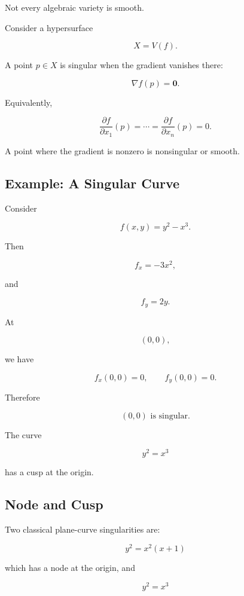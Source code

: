 Not every algebraic variety is smooth.

Consider a hypersurface

\[
X=V(f).
\]

A point \(p\in X\) is singular when the gradient vanishes there:

\[
\boxed{
\nabla f(p)=\mathbf{0}.
}
\]

Equivalently,

\[
\boxed{
\frac{\partial f}{\partial x_1}(p)
=
\cdots
=
\frac{\partial f}{\partial x_n}(p)
=
0.
}
\]

A point where the gradient is nonzero is nonsingular or smooth.

\subsection{Example: A Singular Curve}
\label{subsec:singular-curve-example}

Consider

\[
f(x,y)=y^2-x^3.
\]

Then

\[
f_x=-3x^2,
\]

and

\[
f_y=2y.
\]

At

\[
(0,0),
\]

we have

\[
f_x(0,0)=0,
\qquad
f_y(0,0)=0.
\]

Therefore

\[
\boxed{
(0,0)
\text{ is singular.}
}
\]

The curve

\[
y^2=x^3
\]

has a cusp at the origin.

\subsection{Node and Cusp}
\label{subsec:node-and-cusp}

Two classical plane-curve singularities are:

\[
\boxed{
y^2=x^2(x+1)
}
\]

which has a node at the origin, and

\[
\boxed{
y^2=x^3
}
\]

